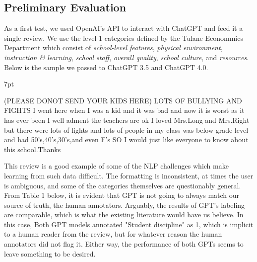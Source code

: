 \documentclass[12pt,a4paper]{article}
\newenvironment{formal}{%
  \def\FrameCommand{%
    \hspace{1pt}%
    {\color{codegreen}\vrule width 2pt}%
    {\color{formalshade}\vrule width 4pt}%
    \colorbox{formalshade}%
  }%
  \MakeFramed{\advance\hsize-\width\FrameRestore}%
  \noindent\hspace{-4.55pt}%
  \begin{adjustwidth}{}{7pt}%
  \vspace{2pt}\vspace{2pt}%
}
{%
  \vspace{2pt}\end{adjustwidth}\endMakeFramed%
}
\begin{document}
\subsection{Preliminary Evaluation}
\noindent As a first test, we used OpenAI's API to interact with ChatGPT and feed it a single review. We use the level 1 categories defined by the Tulane Econommics Department which consist of \textit{school-level features}, \textit{physical environment}, \textit{instruction \& learning}, \textit{school staff}, \textit{overall quality}, \textit{school culture}, and \textit{resources}. Below is the sample we passed to ChatGPT 3.5 and ChatGPT 4.0.

\begin{formal}
(PLEASE DONOT SEND YOUR KIDS HERE) LOTS OF BULLYING AND FIGHTS I went here when I was a kid and it was bad and now it is worst as it has ever been I well adment the teachers are ok I loved Mrs.Long and Mrs.Right but there were lots of fights and lots of people in my class was below grade level and had 50's,40's,30's,and even F's SO I would just like everyone to know about this school.Thanks\\
\end{formal}

\noindent This review is a good example of some of the NLP challenges which make learning from such data difficult. The formatting is inconsistent, at times the user is ambiguous, and some of the categories themselves are questionably general. From Table 1 below, it is evident that GPT is not going to always match our source of truth, the human annotators. Arguably, the results of GPT's labeling are comparable, which is what the existing literature would have us believe. In this case, Both GPT models annotated "Student discipline" as 1, which is implicit to a human reader from the review, but for whatever reason the human annotators did not flag it. Either way, the performance of both GPTs seems to leave something to be desired.\\
\end{document}
